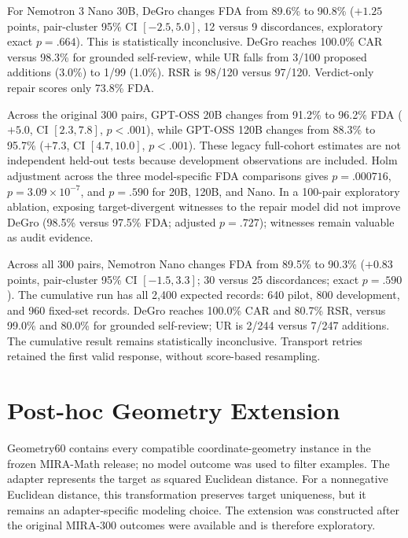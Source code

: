\documentclass[10pt]{article}
\begin{document}
For Nemotron 3 Nano 30B, DeGro changes FDA from 89.6\% to 90.8\% ($+1.25$ points, pair-cluster 95\% CI $[-2.5,5.0]$, 12 versus 9 discordances, exploratory exact $p=.664$). This is statistically inconclusive. DeGro reaches 100.0\% CAR versus 98.3\% for grounded self-review, while UR falls from 3/100 proposed additions (3.0\%) to 1/99 (1.0\%). RSR is 98/120 versus 97/120. Verdict-only repair scores only 73.8\% FDA.

Across the original 300 pairs, GPT-OSS 20B changes from 91.2\% to 96.2\% FDA ($+5.0$, CI $[2.3,7.8]$, $p<.001$), while GPT-OSS 120B changes from 88.3\% to 95.7\% ($+7.3$, CI $[4.7,10.0]$, $p<.001$). These legacy full-cohort estimates are not independent held-out tests because development observations are included. Holm adjustment across the three model-specific FDA comparisons gives $p=.000716$, $p=3.09\times10^{-7}$, and $p=.590$ for 20B, 120B, and Nano. In a 100-pair exploratory ablation, exposing target-divergent witnesses to the repair model did not improve DeGro (98.5\% versus 97.5\% FDA; adjusted $p=.727$); witnesses remain valuable as audit evidence.

Across all 300 pairs, Nemotron Nano changes FDA from 89.5\% to 90.3\% ($+0.83$ points, pair-cluster 95\% CI $[-1.5,3.3]$; 30 versus 25 discordances; exact $p=.590$). The cumulative run has all 2,400 expected records: 640 pilot, 800 development, and 960 fixed-set records. DeGro reaches 100.0\% CAR and 80.7\% RSR, versus 99.0\% and 80.0\% for grounded self-review; UR is 2/244 versus 7/247 additions. The cumulative result remains statistically inconclusive. Transport retries retained the first valid response, without score-based resampling.

\section{Post-hoc Geometry Extension}
Geometry60 contains every compatible coordinate-geometry instance in the frozen MIRA-Math release; no model outcome was used to filter examples. The adapter represents the target as squared Euclidean distance. For a nonnegative Euclidean distance, this transformation preserves target uniqueness, but it remains an adapter-specific modeling choice. The extension was constructed after the original MIRA-300 outcomes were available and is therefore exploratory.
\end{document}
